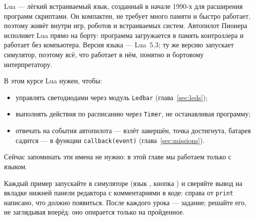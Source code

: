 Lua --- лёгкий встраиваемый язык, созданный в начале 1990-х для расширения программ скриптами. Он компактен, не требует много памяти и быстро работает, поэтому живёт внутри игр, роботов и встраиваемых систем. Автопилот Пионера исполняет Lua прямо на борту: программа загружается в память контроллера и работает без компьютера. Версия языка --- Lua~5.3; ту же версию запускает симулятор, поэтому всё, что работает в нём, понятно и бортовому интерпретатору.

В этом курсе Lua нужен, чтобы:
\begin{itemize}
    \item управлять светодиодами через модуль \texttt{Ledbar} (глава~\ref{sec:leds});
    \item выполнять действия по расписанию через \texttt{Timer}, не останавливая программу;
    \item отвечать на события автопилота --- взлёт завершён, точка достигнута, батарея садится --- в функции \texttt{callback(event)} (глава~\ref{sec:missions}).
\end{itemize}
Сейчас запоминать эти имена не нужно: в этой главе мы работаем только с языком.

\begin{rulebox}
Каждый пример запускайте в симуляторе (язык , кнопка ) и сверяйте вывод на вкладке  нижней панели редактора с комментариями в коде: справа от \texttt{print} написано, что должно появиться. После каждого урока --- задание; решайте его, не заглядывая вперёд: оно опирается только на пройденное.
\end{rulebox}

